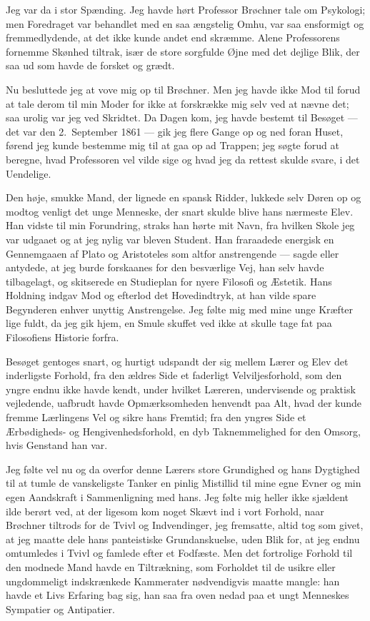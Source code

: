\documentclass[12pt,a4paper]{article}
\newcommand{\apage}[1]{\marginnote{\footnotesize\textit{[#1]}}}
\begin{document}
Jeg var da i stor Spænding. Jeg havde hørt Professor Brøchner tale om
Psykologi; men Foredraget var behandlet med en saa ængstelig Omhu, var
saa ensformigt og fremmedlydende, at det ikke kunde andet end skræmme.
Alene Professorens fornemme Skønhed tiltrak, især de store sorgfulde
Øjne med det dejlige Blik, der saa ud som havde de forsket og grædt.

\apage{130}Nu besluttede jeg at vove mig op til Brøchner. Men jeg
havde ikke Mod til forud at tale derom til min Moder for ikke at
forskrække mig selv ved at nævne det; saa urolig var jeg ved Skridtet.
Da Dagen kom, jeg havde bestemt til Besøget --- det var den 2.\ September
1861 --- gik jeg flere Gange op og ned foran Huset, førend jeg kunde
bestemme mig til at gaa op ad Trappen; jeg søgte forud at beregne,
hvad Professoren vel vilde sige og hvad jeg da rettest skulde svare, i
det Uendelige.

Den høje, smukke Mand, der lignede en spansk Ridder, lukkede selv
Døren op og modtog venligt det unge Menneske, der snart skulde blive
hans nærmeste Elev. Han vidste til min Forundring, straks han hørte
mit Navn, fra hvilken Skole jeg var udgaaet og at jeg nylig var bleven
Student. Han fraraadede energisk en Gennemgaaen af Plato og Aristoteles
som altfor anstrengende --- sagde eller antydede, at jeg burde
forskaanes for den besværlige Vej, han selv havde tilbagelagt, og
skitserede en Studieplan for nyere Filosofi og Æstetik. Hans Holdning
indgav Mod og efterlod det Hovedindtryk, at han vilde spare Begynderen
enhver unyttig Anstrengelse. Jeg følte mig med mine unge Kræfter lige
fuldt, da jeg gik hjem, en Smule skuffet ved ikke at skulle tage fat
paa Filosofiens Historie forfra.

Besøget gentoges snart, og hurtigt udspandt der sig mellem Lærer og
Elev det inderligste Forhold, fra den ældres Side et faderligt
Velviljesforhold, som den yngre endnu ikke havde kendt, under hvilket
Læreren, undervisende og praktisk vejledende, uafbrudt havde
Opmærksomheden henvendt paa Alt, hvad der kunde fremme Lærlingens Vel
og sikre hans Fremtid; fra den yngres Side et Ærbødigheds- og
Hengivenhedsforhold, en dyb Taknemmelighed for den Omsorg, hvis
Genstand han var.

Jeg følte vel nu og da overfor denne Lærers store \apage{131}Grundighed og hans Dygtighed til at tumle de vanskeligste Tanker en pinlig
Mistillid til mine egne Evner og min egen Aandskraft i Sammenligning
med hans. Jeg følte mig heller ikke sjældent ilde berørt ved, at der
ligesom kom noget Skævt ind i vort Forhold, naar Brøchner tiltrods for
de Tvivl og Indvendinger, jeg fremsatte, altid tog som givet, at jeg
maatte dele hans panteistiske Grundanskuelse, uden Blik for, at jeg
endnu omtumledes i Tvivl og famlede efter et Fodfæste. Men det
fortrolige Forhold til den modnede Mand havde en Tiltrækning, som
Forholdet til de usikre eller ungdommeligt indskrænkede Kammerater
nødvendigvis maatte mangle: han havde et Livs Erfaring bag sig, han
saa fra oven nedad paa et ungt Menneskes Sympatier og Antipatier.
\end{document}
